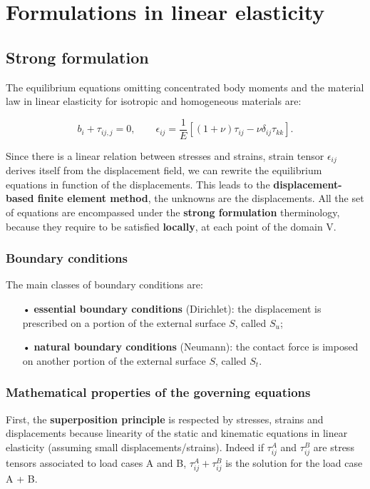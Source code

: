 
\chapter{Formulations in linear elasticity}
\section{Strong formulation}	
	The equilibrium equations omitting concentrated body moments and the material law in linear elasticity for isotropic and homogeneous materials are:
	
	\begin{equation}
	b_i + \tau _{ij,j} = 0, \qquad \epsilon _{ij} = \frac{1}{E }[(1+\nu) \tau _{ij} - \nu \delta _{ij} \tau _{kk}].
	\end{equation}
	
	Since there is a linear relation between stresses and strains, strain tensor $\epsilon _{ij}$ derives itself from the displacement field, we can rewrite the equilibrium equations in function of the displacements. This leads to the \textbf{displacement-based finite element method}, the unknowns are the displacements. All the set of equations are encompassed under the \textbf{strong formulation} therminology, because they require to be satisfied \textbf{locally}, at each point of the domain V.
	
\subsection{Boundary conditions}
	The main classes of boundary conditions are: 
	
	\begin{itemize}
	\item[•] \textbf{essential boundary conditions} (Dirichlet): the displacement is prescribed on a portion of the external surface $S$, called $S_u$; \\
	
	\item[•] \textbf{natural boundary conditions} (Neumann): the contact force is imposed on another portion of the external surface $S$, called $S_t$. 
	\end{itemize}
	
\subsection{Mathematical properties of the governing equations}
	First, the \textbf{superposition principle} is respected by stresses, strains and displacements because linearity of the static and kinematic equations in linear elasticity (assuming small displacements/strains). Indeed if $\tau _{ij}^A$ and $\tau _{ij}^B$ are stress tensors associated to load cases A and B, $\tau _{ij}^A + \tau _{ij}^B$ is the solution for the load case A + B. \\
	
